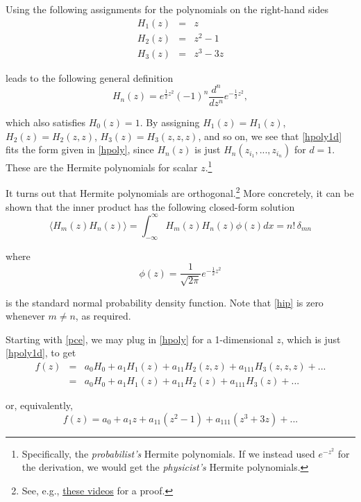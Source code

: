 \documentclass[11pt]{article}
\numberwithin{equation}{section}
\begin{document}
Using the following assignments for the polynomials on the right-hand sides
\begin{eqnarray*}
H_1(z) & = & z \\
H_2(z) & = & z^2 - 1 \\
H_3(z) & = & z^3 - 3 z
\end{eqnarray*}

leads to the following general definition
\begin{equation}
H_n(z) = e^{\frac{1}{2} z^2} (-1)^n \frac{d^n}{dz^n} e^{-\frac{1}{2} z^2}, \label{hpoly1d}
\end{equation}

which also satisfies $H_0(z) = 1$. By assigning $H_1(z) = H_1(z)$, $H_2(z) = H_2(z, z)$, $H_3(z) = H_3(z, z, z)$, and so on, we see that \eqref{hpoly1d} fits the form given in \eqref{hpoly}, since $H_n(z)$ is just $H_n (z_{i_1}, ..., z_{i_n})$ for $d = 1$. These are the Hermite polynomials for scalar $z$.\footnote{Specifically, the {\em probabilist's} Hermite polynomials. If we instead used $e^{-z^2}$ for the derivation, we would get the {\em physicist's} Hermite polynomials.}

\qquad It turns out that Hermite polynomials are orthogonal.\footnote{See, e.g., \href{https://www.youtube.com/playlist?list=PL2uXHjNuf12byaQWF2IU7i7h8D70-d8MW}{these videos} for a proof.} More concretely, it can be shown that the inner product has the following closed-form solution
\begin{equation}
\langle H_m(z) H_n(z) \rangle = \int_{-\infty}^{\infty} H_m(z) H_n(z) \phi(z) dx =  n! \, \delta_{mn} \label{hip}
\end{equation}

where
\begin{equation*}
\phi(z) = \frac{1}{\sqrt{2 \pi}}e^{-\frac{1}{2} z^2}
\end{equation*}

is the standard normal probability density function. Note that \eqref{hip} is zero whenever $m \neq n$, as required.

\qquad Starting with \eqref{pce}, we may plug in \eqref{hpoly} for a 1-dimensional $z$, which is just \eqref{hpoly1d}, to get 
\begin{eqnarray}
f(z) & = & a_0 H_0 + a_1 H_1(z)  + a_{11} H_2(z, z) + a_{111} H_3(z, z, z) + ... \nonumber \\
& = & a_0 H_0 + a_1 H_1(z)  + a_{11} H_2(z) + a_{111} H_3(z) + ...
\end{eqnarray}

or, equivalently,
\begin{equation}
f(z) = a_0 +  a_1 z + a_{11} (z^2 - 1) + a_{111} (z^3 + 3 z) + ...
\end{equation}
\end{document}
